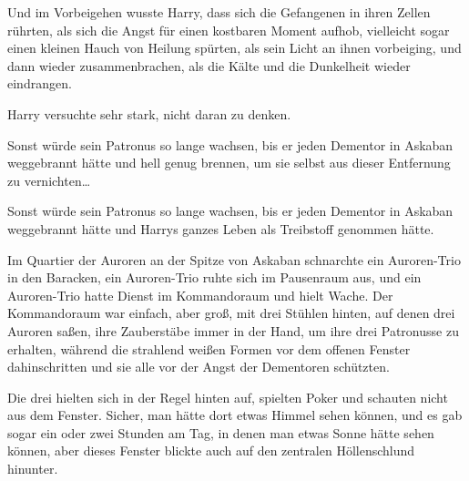 Und im Vorbeigehen wusste Harry, dass sich die Gefangenen in ihren Zellen rührten, als sich die Angst für einen kostbaren Moment aufhob, vielleicht sogar einen kleinen Hauch von Heilung spürten, als sein Licht an ihnen vorbeiging, und dann wieder zusammenbrachen, als die Kälte und die Dunkelheit wieder eindrangen.

Harry versuchte sehr stark, nicht daran zu denken.

Sonst würde sein Patronus so lange wachsen, bis er jeden Dementor in Askaban weggebrannt hätte und hell genug brennen, um sie selbst aus dieser Entfernung zu vernichten…

Sonst würde sein Patronus so lange wachsen, bis er jeden Dementor in Askaban weggebrannt hätte und Harrys ganzes Leben als Treibstoff genommen hätte.

\later

Im Quartier der Auroren an der Spitze von Askaban schnarchte ein Auroren-Trio in den Baracken, ein Auroren-Trio ruhte sich im Pausenraum aus, und ein Auroren-Trio hatte Dienst im Kommandoraum und hielt Wache. Der Kommandoraum war einfach, aber groß, mit drei Stühlen hinten, auf denen drei Auroren saßen, ihre Zauberstäbe immer in der Hand, um ihre drei Patronusse zu erhalten, während die strahlend weißen Formen vor dem offenen Fenster dahinschritten und sie alle vor der Angst der Dementoren schützten.

Die drei hielten sich in der Regel hinten auf, spielten Poker und schauten nicht aus dem Fenster. Sicher, man hätte dort etwas Himmel sehen können, und es gab sogar ein oder zwei Stunden am Tag, in denen man etwas Sonne hätte sehen können, aber dieses Fenster blickte auch auf den zentralen Höllenschlund hinunter.

